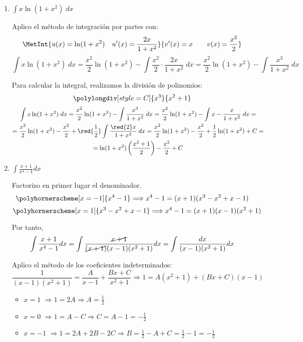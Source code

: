 \begin{ejercicio}
\begin{enumerate}
    \item $\displaystyle \int x\ln(1+x^2)\;dx$

    Aplico el método de integración por partes con:
    \begin{equation*}
        \MetInt{u(x)=\ln(1+x^2) \quad u'(x)=\frac{2x}{1+x^2}}{v'(x)=x \qquad v(x)=\frac{x^2}{2}}
    \end{equation*}
    \begin{equation*}
        \int x\ln(1+x^2)\;dx = \frac{x^2}{2}\ln(1+x^2)-\int\frac{x^2}{2}\cdot \frac{2x}{1+x^2}\;dx
        = \frac{x^2}{2}\ln(1+x^2)-\int \frac{x^3}{1+x^2}\;dx
    \end{equation*}

    Para calcular la integral, realizamos la división de polinomios:
    $$\polylongdiv[style=C]{x^3}{x^2+1}$$
    \begin{multline*}
        \int x\ln(1+x^2)\;dx
        = \frac{x^2}{2}\ln(1+x^2)-\int \frac{x^3}{1+x^2}\;dx
        = \frac{x^2}{2}\ln(1+x^2)-\int x-\frac{x}{1+x^2}\;dx
        =\\=
        \frac{x^2}{2}\ln(1+x^2)-\frac{x^2}{2} +\red{\frac{1}{2}}\int \frac{\red{2}x}{1+x^2}\;dx
        = \frac{x^2}{2}\ln(1+x^2)-\frac{x^2}{2} +\frac{1}{2}\ln(1+x^2) +C
        =\\= \ln(1+x^2) \left(\frac{x^2+1}{2}\right) - \frac{x^2}{2} + C
    \end{multline*}

    \item $\displaystyle \int \frac{x+1}{x^4 -1} dx$

    Factorizo en primer lugar el denominador.
    $$\polyhornerscheme[x=-1]{x^4-1} \Longrightarrow x^4-1=(x+1)(x^3-x^2+x-1)$$
    $$\polyhornerscheme[x=1]{x^3-x^2+x-1} \Longrightarrow x^4-1=(x+1)(x-1)(x^2+1)$$

    Por tanto,
    \begin{equation*}
        \int \frac{x+1}{x^4 -1} dx = \int \frac{\cancel{x+1}}{\cancel{(x+1)}(x-1)(x^2+1)}dx
        = \int \frac{dx}{(x-1)(x^2+1)}dx
    \end{equation*}

    Aplico el método de los coeficientes indeterminados:
    \begin{equation*}
        \frac{1}{(x-1)(x^2+1)} = \frac{A}{x-1}+\frac{Bx+C}{x^2+1} \Longrightarrow 1=A(x^2+1)+(Bx+C)(x-1)
    \end{equation*}
    \begin{itemize}
        \item \underline{$x=1$} $\Longrightarrow 1=2A \Longrightarrow A=\frac{1}{2}$
        \item \underline{$x=0$} $\Longrightarrow 1=A-C \Longrightarrow C=A-1 = -\frac{1}{2}$
        \item \underline{$x=-1$} $\Longrightarrow 1=2A+2B-2C \Longrightarrow B=\frac{1}{2}-A+C=\frac{1}{2}-1 = -\frac{1}{2}$
    \end{itemize}
    

\end{enumerate}
\end{ejercicio}
